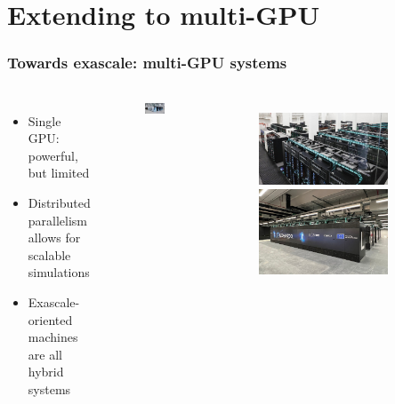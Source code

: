\section{Extending to multi-GPU}

\begin{frame}
	\frametitle{Towards exascale: multi-GPU systems}
	\begin{columns}
		\begin{itemize}
			\item Single GPU: powerful, but limited
			\item Distributed parallelism allows for scalable simulations
			\item Exascale-oriented machines are all hybrid systems
		\end{itemize}
		\begin{figure}
			\centering
			\includegraphics[width=0.8\textwidth]{images/LUMI.jpg}
		\end{figure}
		\begin{figure}
			\centering
			\includegraphics[width=0.8\textwidth]{images/MN5.jpg}
			\includegraphics[width=0.8\textwidth]{images/leonardo.jpg}
		\end{figure}
	\end{columns}
\end{frame}

